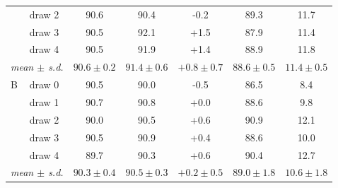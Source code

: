 \begin{table}[t]
\begin{tabular}{llccccc}
 & draw 2 & 90.6 & 90.4 & -0.2 & 89.3 & 11.7 \\
 & draw 3 & 90.5 & 92.1 & +1.5 & 87.9 & 11.4 \\
 & draw 4 & 90.5 & 91.9 & +1.4 & 88.9 & 11.8 \\
\multicolumn{2}{l}{\emph{mean $\pm$ s.d.}} & $90.6\pm0.2$ & $91.4\pm0.6$ & $+0.8\pm0.7$ & $88.6\pm0.5$ & $11.4\pm0.5$ \\
\midrule
B & draw 0 & 90.5 & 90.0 & -0.5 & 86.5 & 8.4 \\
 & draw 1 & 90.7 & 90.8 & +0.0 & 88.6 & 9.8 \\
 & draw 2 & 90.0 & 90.5 & +0.6 & 90.9 & 12.1 \\
 & draw 3 & 90.5 & 90.9 & +0.4 & 88.6 & 10.0 \\
 & draw 4 & 89.7 & 90.3 & +0.6 & 90.4 & 12.7 \\
\multicolumn{2}{l}{\emph{mean $\pm$ s.d.}} & $90.3\pm0.4$ & $90.5\pm0.3$ & $+0.2\pm0.5$ & $89.0\pm1.8$ & $10.6\pm1.8$ \\
\bottomrule
\end{tabular}
\end{table}